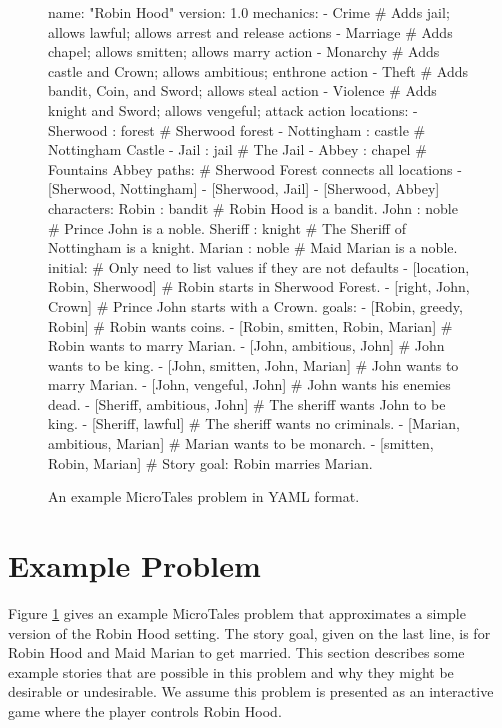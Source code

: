 \documentclass{nilreport}
\begin{document}
\newpage

\begin{figure}[!ht]
{\small
\begin{code}
name: "Robin Hood"
version: 1.0
mechanics:
- Crime    # Adds jail; allows lawful; allows arrest and release actions
- Marriage # Adds chapel; allows smitten; allows marry action
- Monarchy # Adds castle and Crown; allows ambitious; enthrone action
- Theft    # Adds bandit, Coin, and Sword; allows steal action
- Violence # Adds knight and Sword; allows vengeful; attack action
locations:
- Sherwood : forest   # Sherwood forest
- Nottingham : castle # Nottingham Castle
- Jail : jail         # The Jail
- Abbey : chapel      # Fountains Abbey
paths: # Sherwood Forest connects all locations
- [Sherwood, Nottingham]
- [Sherwood, Jail]
- [Sherwood, Abbey]
characters:
  Robin : bandit   # Robin Hood is a bandit.
  John : noble     # Prince John is a noble.
  Sheriff : knight # The Sheriff of Nottingham is a knight.
  Marian : noble   # Maid Marian is a noble.
initial: # Only need to list values if they are not defaults
- [location, Robin, Sherwood] # Robin starts in Sherwood Forest.
- [right, John, Crown]        # Prince John starts with a Crown.
goals:
- [Robin, greedy, Robin]           # Robin wants coins.
- [Robin, smitten, Robin, Marian]  # Robin wants to marry Marian.
- [John, ambitious, John]          # John wants to be king.
- [John, smitten, John, Marian]    # John wants to marry Marian.
- [John, vengeful, John]           # John wants his enemies dead.
- [Sheriff, ambitious, John]       # The sheriff wants John to be king.
- [Sheriff, lawful]                # The sheriff wants no criminals.
- [Marian, ambitious, Marian]      # Marian wants to be monarch.
- [smitten, Robin, Marian]         # Story goal: Robin marries Marian.
\end{code}}
\vspace{-1em}
\caption{An example MicroTales problem in YAML format.}
\label{fig:problemex}
\end{figure}

\section{Example Problem}

Figure \ref{fig:problemex} gives an example MicroTales problem that approximates a simple version of the Robin Hood setting. The story goal, given on the last line, is for Robin Hood and Maid Marian to get married. This section describes some example stories that are possible in this problem and why they might be desirable or undesirable. We assume this problem is presented as an interactive game where the player controls Robin Hood.
\end{document}
